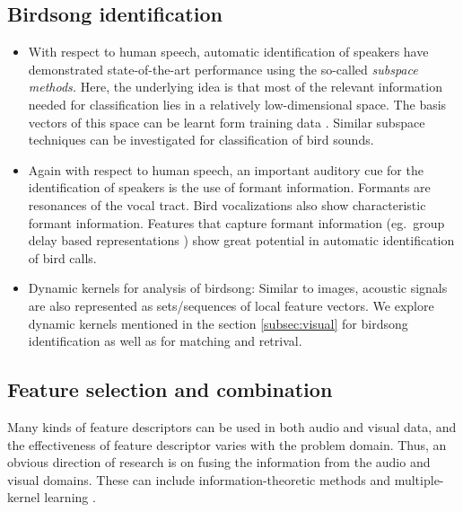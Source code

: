 \documentclass{article}
\begin{document}
\subsection{Birdsong identification}

\begin{itemize}
\item With respect to human speech, automatic identification of speakers have
demonstrated state-of-the-art performance using the so-called \emph{subspace
methods.} Here, the underlying idea is that most of the relevant information
needed for classification 
lies in a relatively low-dimensional space. The basis vectors of this space can
be learnt form training data \cite{dehak_ivector}. Similar subspace techniques
can be investigated for classification of bird sounds.
\item Again with respect to human speech, an important auditory cue for the
identification of speakers is the use of formant information. Formants are
resonances of the vocal tract. Bird vocalizations also show characteristic
formant information. Features that capture formant information (eg.~group delay
based representations \cite{padmanAllPoleGDelay, hegdeModgdf}) show great potential in
automatic identification of bird calls.

\item Dynamic kernels for analysis of birdsong: Similar to images, acoustic signals are also represented as sets/sequences of local feature vectors. We explore dynamic kernels mentioned in the section \ref{subsec:visual} for birdsong identification as well as for matching and retrival.  

\end{itemize}





\subsection{Feature selection and combination}

Many kinds of feature descriptors can be used in both audio and visual data, and
the effectiveness of feature descriptor varies with the problem domain. Thus, an
obvious direction of research is on fusing the information from the audio and visual domains.
These can include information-theoretic methods and multiple-kernel learning
\cite{LargeScaleMKL,mkl2}.

\end{document}
